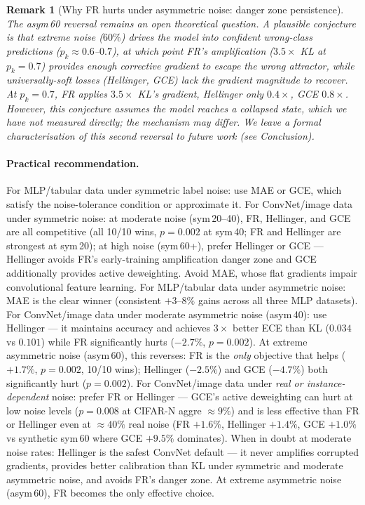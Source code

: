 \documentclass[11pt]{article}
\newtheorem{remark}{Remark}
\begin{document}
\begin{remark}[Why FR hurts under asymmetric noise: danger zone persistence]
The asym\,60 reversal remains an open theoretical question.
A plausible conjecture is that extreme noise ($60\%$) drives the model into confident
wrong-class predictions ($p_k \approx 0.6$--$0.7$), at which point FR's amplification
($3.5\times$ KL at $p_k=0.7$) provides enough corrective gradient to escape the wrong
attractor, while universally-soft losses (Hellinger, GCE) lack the gradient magnitude
to recover.
At $p_k = 0.7$, FR applies $3.5\times$ KL's gradient, Hellinger only $0.4\times$,
GCE $0.8\times$.
However, this conjecture assumes the model reaches a collapsed state, which we have not
measured directly; the mechanism may differ.
We leave a formal characterisation of this second reversal to future work (see Conclusion).
\end{remark}

\paragraph{Practical recommendation.}
For MLP/tabular data under symmetric label noise: use MAE or GCE, which
satisfy the noise-tolerance condition or approximate it.
For ConvNet/image data under symmetric noise: at moderate noise (sym\,20--40), FR,
Hellinger, and GCE are all competitive (all 10/10 wins, $p=0.002$ at sym\,40; FR and
Hellinger are strongest at sym\,20); at high noise (sym\,60+), prefer Hellinger or GCE —
Hellinger avoids FR's early-training amplification danger zone and GCE additionally
provides active deweighting. Avoid MAE, whose flat gradients impair convolutional feature learning.
For MLP/tabular data under asymmetric noise: MAE is the clear winner
(consistent $+3$--$8\%$ gains across all three MLP datasets).
For ConvNet/image data under moderate asymmetric noise (asym\,40): use Hellinger
--- it maintains accuracy and achieves $3\times$ better ECE than KL ($0.034$ vs $0.101$)
while FR significantly hurts ($-2.7\%$, $p=0.002$).
At extreme asymmetric noise (asym\,60), this reverses: FR is the \emph{only} objective
that helps ($+1.7\%$, $p=0.002$, 10/10 wins); Hellinger ($-2.5\%$) and GCE ($-4.7\%$)
both significantly hurt ($p=0.002$).
For ConvNet/image data under \emph{real or instance-dependent} noise: prefer
FR or Hellinger — GCE's active deweighting can hurt at low noise levels
($p=0.008$ at CIFAR-N aggre $\approx 9\%$) and is less effective than FR or Hellinger
even at $\approx 40\%$ real noise (FR $+1.6\%$, Hellinger $+1.4\%$, GCE $+1.0\%$
vs synthetic sym\,60 where GCE $+9.5\%$ dominates).
When in doubt at moderate noise rates: Hellinger is the safest ConvNet default ---
it never amplifies corrupted gradients, provides better calibration than KL under
symmetric and moderate asymmetric noise, and avoids FR's danger zone.
At extreme asymmetric noise (asym\,60), FR becomes the only effective choice.
\end{document}
